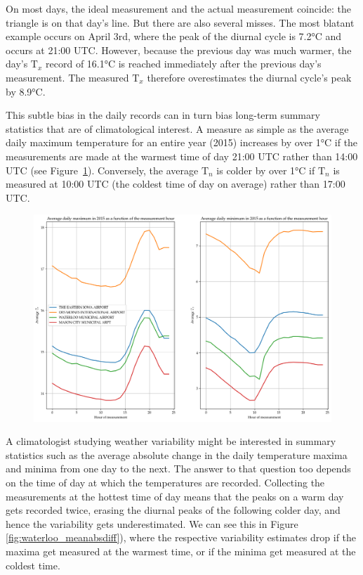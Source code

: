 \documentclass[letter]{article}
\makeatletter
\def\maxwidth{\ifdim\Gin@nat@width>\linewidth\linewidth
\else\Gin@nat@width\fi}
\let\Oldincludegraphics\includegraphics
\renewcommand{\includegraphics}[1]{\Oldincludegraphics[width=.8\maxwidth]{#1}}
\newcommand{\T}{\mathrm{T}}
\newcommand{\Tn}{\T_{n}}
\newcommand{\Tx}{\T_{x}}
\makeatother
\begin{document}
On most days, the ideal measurement and the actual measurement coincide: the triangle is on that day's line.
But there are also several misses. The most blatant example occurs on April 3rd,
where the peak of the diurnal cycle is 7.2°C and occurs at 21:00 UTC.
However, because the previous day was much warmer, the day's \(\Tx\) record of 16.1°C is reached immediately after the previous day's measurement.
The measured \(\Tx\) therefore overestimates the diurnal cycle's peak by 8.9°C.
    


        This subtle bias in the daily records can in turn bias long-term summary statistics that are of climatological interest.
A measure as simple as the average daily maximum temperature for an entire year (2015) increases by over 1°C if the measurements are made at the warmest time of day 21:00 UTC rather than 14:00 UTC (see Figure~\ref{fig:waterloo_avgTnTx}).
Conversely, the average \(\Tn\) is colder by over 1°C if \(\Tn\) is measured at 10:00 UTC (the coldest time of day on average) rather than 17:00 UTC.

\begin{figure}
\centering
\includegraphics{figures/waterloo_avgTnTx.png}
\caption{\label{fig:waterloo_avgTnTx}}
\end{figure}
    


        A climatologist studying weather variability might be interested in summary statistics such as the average absolute change in the daily temperature maxima and minima from one day to the next.
The answer to that question too depends on the time of day at which the temperatures are recorded.
Collecting the measurements at the hottest time of day means that the peaks on a warm day gets recorded twice,
erasing the diurnal peaks of the following colder day,
and hence the variability gets underestimated.
We can see this in Figure \ref{fig:waterloo_meanabsdiff}), where the respective variability estimates drop if the maxima get measured at the warmest time, or if the minima get measured at the coldest time.
\end{document}
